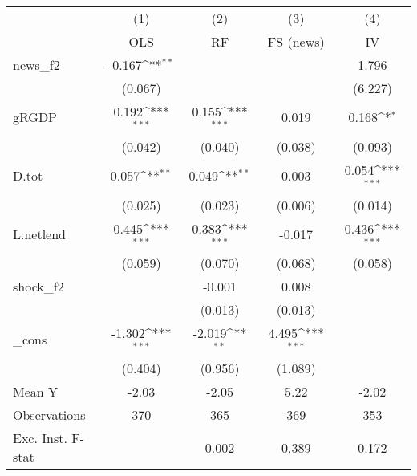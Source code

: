 {
\def\sym#1{\ifmmode^{#1}\else\(^{#1}\)\fi}
\begin{tabular}{l*{4}{c}}
\toprule
            &\multicolumn{1}{c}{(1)}&\multicolumn{1}{c}{(2)}&\multicolumn{1}{c}{(3)}&\multicolumn{1}{c}{(4)}\\
            &\multicolumn{1}{c}{OLS}&\multicolumn{1}{c}{RF}&\multicolumn{1}{c}{FS (news)}&\multicolumn{1}{c}{IV}\\
\midrule
news\_f2     &      -0.167\sym{**} &                     &                     &       1.796         \\
            &     (0.067)         &                     &                     &     (6.227)         \\
\addlinespace
gRGDP       &       0.192\sym{***}&       0.155\sym{***}&       0.019         &       0.168\sym{*}  \\
            &     (0.042)         &     (0.040)         &     (0.038)         &     (0.093)         \\
\addlinespace
D.tot       &       0.057\sym{**} &       0.049\sym{**} &       0.003         &       0.054\sym{***}\\
            &     (0.025)         &     (0.023)         &     (0.006)         &     (0.014)         \\
\addlinespace
L.netlend   &       0.445\sym{***}&       0.383\sym{***}&      -0.017         &       0.436\sym{***}\\
            &     (0.059)         &     (0.070)         &     (0.068)         &     (0.058)         \\
\addlinespace
shock\_f2    &                     &      -0.001         &       0.008         &                     \\
            &                     &     (0.013)         &     (0.013)         &                     \\
\addlinespace
\_cons      &      -1.302\sym{***}&      -2.019\sym{**} &       4.495\sym{***}&                     \\
            &     (0.404)         &     (0.956)         &     (1.089)         &                     \\
\midrule
Mean Y      &       -2.03         &       -2.05         &        5.22         &       -2.02         \\
Observations&         370         &         365         &         369         &         353         \\
Exc. Inst. F-stat&                     &       0.002         &       0.389         &       0.172         \\
\bottomrule
\end{tabular}
}
